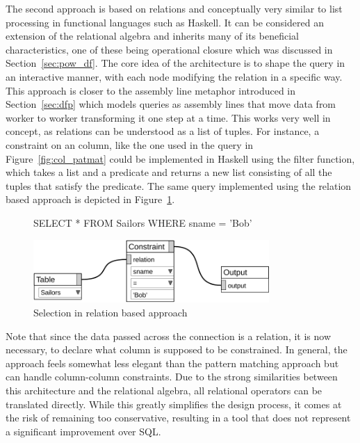 \documentclass[11pt,a4paper]{globis-book}
\begin{document}
The second approach is based on relations and conceptually very similar to list processing in functional languages such as Haskell. It can be considered an extension of the relational algebra and inherits many of its beneficial characteristics, one of these being operational closure which was discussed in Section~\ref{sec:pow_df}. The core idea of the architecture is to shape the query in an interactive manner, with each node modifying the relation in a specific way. This approach is closer to the assembly line metaphor introduced in Section~\ref{sec:dfp} which models queries as assembly lines that move data from worker to worker transforming it one step at a time. This works very well in concept, as relations can be understood as a list of tuples. For instance, a constraint on an column, like the one used in the query in Figure~\ref{fig:col_patmat} could be implemented in Haskell using the filter function, which takes a list and a predicate and returns a new list consisting of all the tuples that satisfy the predicate. The same query implemented using the relation based approach is depicted in Figure~\ref{fig:rel_constraint}.

\begin{figure}[h]
\begin{codeex}
SELECT *
FROM Sailors
WHERE sname = 'Bob'
\end{codeex}

  \centering
  \includegraphics[width=0.8\textwidth]{resources/RelConstraint.pdf}
  \caption{Selection in relation based approach}
  \label{fig:rel_constraint}
\end{figure}

Note that since the data passed across the connection is a relation, it is now necessary, to declare what column is supposed to be constrained. In general, the approach feels somewhat less elegant than the pattern matching approach but can handle column-column constraints. Due to the strong similarities between this architecture and the relational algebra, all relational operators can be translated directly. While this greatly simplifies the design process, it comes at the risk of remaining too conservative, resulting in a tool that does not represent a significant improvement over SQL.
\end{document}
